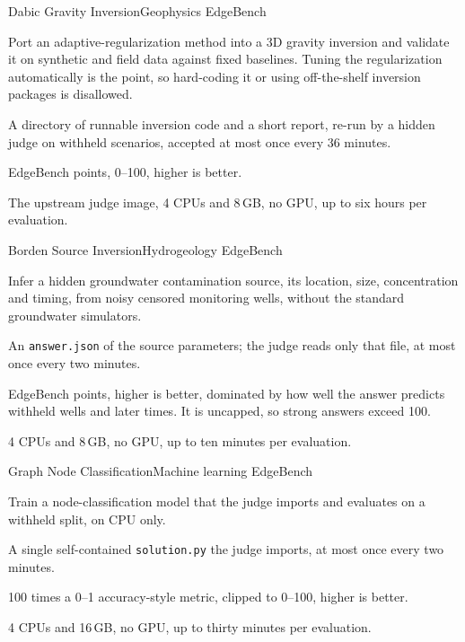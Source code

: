 \documentclass[numbers,10pt]{arxiv}
\newenvironment{cardfields}{\begin{description}[style=sameline, leftmargin=5.9em, labelwidth=5.5em, labelsep=0.4em,
  font=\sffamily\footnotesize\bfseries, itemsep=1pt, parsep=0pt, topsep=1pt, partopsep=0pt]\small}{\end{description}}
\begin{document}
\begin{taskcard}{Dabic Gravity Inversion}{Geophysics \textperiodcentered{} EdgeBench}
\begin{cardfields}
\item[Goal] Port an adaptive-regularization method into a 3D gravity inversion and validate it on synthetic and field data against fixed baselines. Tuning the regularization automatically is the point, so hard-coding it or using off-the-shelf inversion packages is disallowed.
\item[Submission] A directory of runnable inversion code and a short report, re-run by a hidden judge on withheld scenarios, accepted at most once every 36 minutes.
\item[Score] EdgeBench points, 0--100, higher is better.
\item[Judge] The upstream judge image, 4 CPUs and 8\,GB, no GPU, up to six hours per evaluation.
\end{cardfields}
\end{taskcard}
\begin{taskcard}{Borden Source Inversion}{Hydrogeology \textperiodcentered{} EdgeBench}
\begin{cardfields}
\item[Goal] Infer a hidden groundwater contamination source, its location, size, concentration and timing, from noisy censored monitoring wells, without the standard groundwater simulators.
\item[Submission] An \texttt{answer.json} of the source parameters; the judge reads only that file, at most once every two minutes.
\item[Score] EdgeBench points, higher is better, dominated by how well the answer predicts withheld wells and later times. It is uncapped, so strong answers exceed 100.
\item[Judge] 4 CPUs and 8\,GB, no GPU, up to ten minutes per evaluation.
\end{cardfields}
\end{taskcard}
\begin{taskcard}{Graph Node Classification}{Machine learning \textperiodcentered{} EdgeBench}
\begin{cardfields}
\item[Goal] Train a node-classification model that the judge imports and evaluates on a withheld split, on CPU only.
\item[Submission] A single self-contained \texttt{solution.py} the judge imports, at most once every two minutes.
\item[Score] 100 times a 0--1 accuracy-style metric, clipped to 0--100, higher is better.
\item[Judge] 4 CPUs and 16\,GB, no GPU, up to thirty minutes per evaluation.
\end{cardfields}
\end{taskcard}
\end{document}
